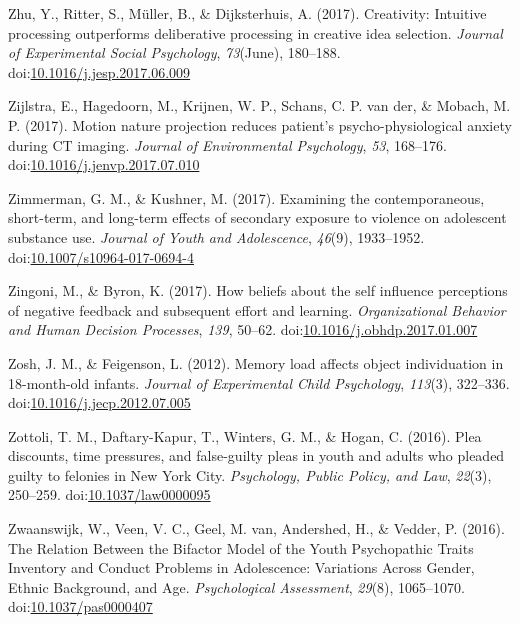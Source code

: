 \documentclass[english,man]{apa6}
\theoremstyle{definition}
\theoremstyle{definition}
\theoremstyle{definition}
\theoremstyle{remark}
\begin{document}
\hypertarget{ref-Zhu2017}{}
Zhu, Y., Ritter, S., Müller, B., \& Dijksterhuis, A. (2017). Creativity:
Intuitive processing outperforms deliberative processing in creative
idea selection. \emph{Journal of Experimental Social Psychology},
\emph{73}(June), 180--188.
doi:\href{https://doi.org/10.1016/j.jesp.2017.06.009}{10.1016/j.jesp.2017.06.009}

\hypertarget{ref-Zijlstra2017}{}
Zijlstra, E., Hagedoorn, M., Krijnen, W. P., Schans, C. P. van der, \&
Mobach, M. P. (2017). Motion nature projection reduces patient's
psycho-physiological anxiety during CT imaging. \emph{Journal of
Environmental Psychology}, \emph{53}, 168--176.
doi:\href{https://doi.org/10.1016/j.jenvp.2017.07.010}{10.1016/j.jenvp.2017.07.010}

\hypertarget{ref-Zimmerman2017}{}
Zimmerman, G. M., \& Kushner, M. (2017). Examining the contemporaneous,
short-term, and long-term effects of secondary exposure to violence on
adolescent substance use. \emph{Journal of Youth and Adolescence},
\emph{46}(9), 1933--1952.
doi:\href{https://doi.org/10.1007/s10964-017-0694-4}{10.1007/s10964-017-0694-4}

\hypertarget{ref-Zingoni2017}{}
Zingoni, M., \& Byron, K. (2017). How beliefs about the self influence
perceptions of negative feedback and subsequent effort and learning.
\emph{Organizational Behavior and Human Decision Processes}, \emph{139},
50--62.
doi:\href{https://doi.org/10.1016/j.obhdp.2017.01.007}{10.1016/j.obhdp.2017.01.007}

\hypertarget{ref-Zosh2012}{}
Zosh, J. M., \& Feigenson, L. (2012). Memory load affects object
individuation in 18-month-old infants. \emph{Journal of Experimental
Child Psychology}, \emph{113}(3), 322--336.
doi:\href{https://doi.org/10.1016/j.jecp.2012.07.005}{10.1016/j.jecp.2012.07.005}

\hypertarget{ref-Zottoli2016}{}
Zottoli, T. M., Daftary-Kapur, T., Winters, G. M., \& Hogan, C. (2016).
Plea discounts, time pressures, and false-guilty pleas in youth and
adults who pleaded guilty to felonies in New York City.
\emph{Psychology, Public Policy, and Law}, \emph{22}(3), 250--259.
doi:\href{https://doi.org/10.1037/law0000095}{10.1037/law0000095}

\hypertarget{ref-Zwaanswijk2016}{}
Zwaanswijk, W., Veen, V. C., Geel, M. van, Andershed, H., \& Vedder, P.
(2016). The Relation Between the Bifactor Model of the Youth
Psychopathic Traits Inventory and Conduct Problems in Adolescence:
Variations Across Gender, Ethnic Background, and Age.
\emph{Psychological Assessment}, \emph{29}(8), 1065--1070.
doi:\href{https://doi.org/10.1037/pas0000407}{10.1037/pas0000407}
\end{document}
